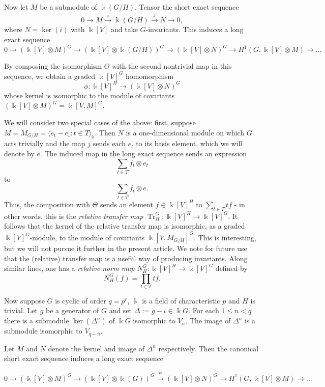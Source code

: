 \documentclass[a4paper]{amsart}
\newcommand{\kk}{\Bbbk}
\def\Tr{\operatorname{Tr}}
\newtheorem*{Corollary of Conjecture}{Corollary of Conjecture}
\theoremstyle{definition}
\theoremstyle{remark}
\theoremstyle{Acknowledgments}
\begin{document}
Now let $M$ be a submodule of $\kk(G/H)$. Tensor the short exact sequence
\[0 \rightarrow M \stackrel{i}{\rightarrow} \kk(G/H) \stackrel{j}{\rightarrow} N \rightarrow 0, \] where $N = \ker(i)$ with $\kk[V]$ and take $G$-invariants. This induces a long exact sequence
\[0 \rightarrow (\kk[V] \otimes M)^G \rightarrow (\kk[V] \otimes \kk(G/H))^G \rightarrow (\kk[V] \otimes N)^G \rightarrow H^1(G,\kk[V] \otimes M) \rightarrow \ldots \]

By composing the isomorphism $\Theta$ with the second nontrivial map in this sequence, we obtain a graded $\kk[V]^G$ homomorphism 
$$\phi: \kk[V]^H \rightarrow (\kk[V] \otimes N)^G$$
whose kernel is isomorphic to the module of covariants $(\kk[V] \otimes M)^G = \kk[V,M]^G$.

We will consider two special cases of the above: first, suppose $M = M_{G/H} = \langle e_t - e_\iota: t \in T\rangle_{\kk}$. Then $N$ is a one-dimensional module on which $G$ acts trivially and the map $j$ sends each $e_t$ to its basis element, which we will denote by $e$. The induced map in the long exact sequence sends an expression $$\sum_{t \in T} f_t \otimes e_t$$ to $$\sum_{t \in T} f_t \otimes e.$$ Thus, the composition with $\Theta$ sends an element $f \in \kk[V]^H$ to $\sum_{t \in T} tf$ - in other words, this is the \emph{relative transfer map} $\Tr^G_H: \kk[V]^H \rightarrow \kk[V]^G$. It follows that the kernel of the relative transfer map is isomorphic, as a graded $\kk[V]^G$-module, to the module of covariants $\kk[V,M_{G/H}]^G$. This is interesting, but we will not pursue it further in the present article. We note for future use that the (relative) transfer map is a useful way of producing invariants. Along similar lines, one has a \emph{relative norm map} $N^G_H:\kk[V]^H \rightarrow \kk[V]^G$ defined by
\[N^G_H(f) = \prod_{t \in T} tf.\]

Now suppose $G$ is cyclic of order $q = p^r$, $\kk$ is a field of characteristic $p$ and $H$ is trivial. Let $g$ be a generator of $G$ and set $\Delta:= g-\iota \in \kk G$. For each $1 \leq n < q$ there is a submodule $\ker(\Delta^n)$ of $\kk G$ isomorphic to $V_n$.  The image of $\Delta^n$ is a submodule isomorphic to $V_{q-n}$. 

Let $M$ and $N$ denote the kernel and image of $\Delta^n$ respectively. Then the canonical short exact sequence induces a long exact sequence

\[0 \rightarrow (\kk[V] \otimes M)^G \rightarrow (\kk[V] \otimes \kk(G))^G \stackrel{\psi}{\rightarrow} (\kk[V] \otimes N)^G \rightarrow H^1(G,\kk[V] \otimes M) \rightarrow \ldots \]
\end{document}
